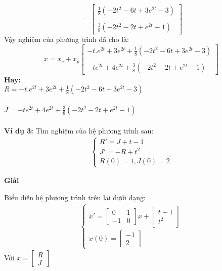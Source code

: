 $$=
\begin{bmatrix}
    \frac{1}{8}(-2t^2-6t+3e^{2t}-3)\\
    \\
    \frac{3}{8}(-2t^2-2t+e^{2t}-1)
\end{bmatrix}
$$
Vậy nghiệm của phương trình đã cho là:
$$x=x_c+x_p
\begin{bmatrix}
    -t.e^{2t}+3e^{2t}+\frac{1}{8}(-2t^2-6t+3e^{2t}-3)\\
    \\
    -te^{2t}+4e^{2t}+\frac{3}{8}(-2t^2-2t+e^{2t}-1)
\end{bmatrix}
$$
\textbf{Hay:}\\
\hspace*{3cm}$R=-t.e^{2t}+3e^{2t}+\frac{1}{8}(-2t^2-6t+3e^{2t}-3)$\\\\
\hspace*{3cm}$J=-te^{2t}+4e^{2t}+\frac{3}{8}(-2t^2-2t+e^{2t}-1)$\\\\
\textbf{Ví dụ 3:} Tìm nghiệm của hệ phương trình sau:
\begin{align*}
    \begin{cases}
        R'=J+t-1\\
        J'=-R+t^2\\
        R(0)=1, J(0)=2
    \end{cases}
\end{align*}
\centerline{\textbf{Giải}}
Biểu diễn hệ phương trình trên lại dưới dạng:
\begin{align*}
    \begin{cases}
        x'=
        \begin{bmatrix}
        0 & 1\\
        -1 & 0
        \end{bmatrix}
        x+
        \begin{bmatrix}
        t-1\\
        t^2
        \end{bmatrix}\\
        x(0)=\begin{bmatrix}
        -1\\
        2
        \end{bmatrix}
    \end{cases}
\end{align*}
\hspace{0.3cm}Với $x=
\begin{bmatrix}
    R\\
    J
\end{bmatrix}$\\
